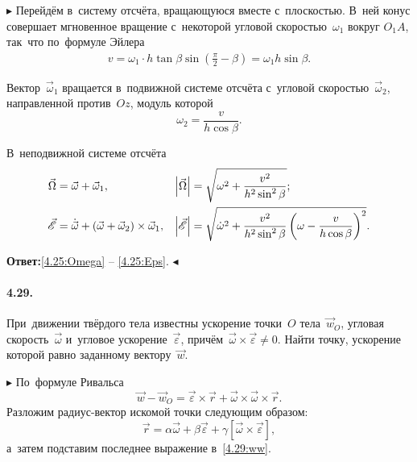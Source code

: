 \documentclass{weekly}
\begin{document}
$\blacktriangleright$ Перейдём в~систему отсчёта, вращающуюся
вместе с~плоскостью. В~ней конус совершает мгновенное вращение
с~некоторой угловой скоростью~$\omega_1$ вокруг $O_1A$,
так~что по~формуле Эйлера
\begin{align}
    v = \omega_1 \cdot h \tan\beta
            \sin\left(\frac{\pi}{2} - \beta\right)
        = \omega_1 h \sin\beta.
\end{align}

Вектор~$\vec\omega_1$ вращается в~подвижной системе отсчёта
с~угловой скоростью~$\vec\omega_2$, направленной
против~$Oz$, модуль которой
\begin{equation}
    \omega_2 = \frac{v}{h\cos\beta}.
\end{equation}

В~неподвижной системе отсчёта
\begin{align}
    \vec\Omega &= \vec\omega + \vec\omega_1, &
    \left| \vec\Omega \right| &= \sqrt{\omega^2 + \frac{v^2}{h^2\sin^2\beta}};
    \label{4.25:Omega}
\\
    \vec{\mathscr{E}} &= \dot{\vec\omega} +
            \left(\vec\omega + \vec\omega_2\right) \times \vec\omega_1, &
    \left| \vec{\mathscr{E}} \right| &= \sqrt{\dot\omega^2 +
            \frac{v^2}{h^2\sin^2\beta}
            \left(\omega - \frac{v}{h\cos\beta}\right)^2}.
    \label{4.25:Eps}
\end{align}

\textbf{Ответ:}\quad \eqref{4.25:Omega} -- \eqref{4.25:Eps}.
\hfill $\blacktriangleleft$


\paragraph{4.29.} При~движении твёрдого тела известны ускорение
точки~$O$ тела~$\vec w_O$, угловая скорость~$\vec\omega$
и~угловое ускорение~$\vec\varepsilon$,
причём~$\vec\omega \times \vec\varepsilon \neq 0$.
Найти точку, ускорение которой равно заданному вектору~$\vec w$.

$\blacktriangleright$ По~формуле Ривальса
\begin{equation}
    \vec w - \vec w_O = \vec\varepsilon \times \vec r +
            \vec\omega \times \vec\omega \times \vec r. \label{4.29:ww}
\end{equation}
Разложим радиус-вектор искомой точки следующим образом:
\begin{equation}
    \vec r = \alpha \vec\omega + \beta \vec\varepsilon +
            \gamma \left[\vec\omega \times \vec\varepsilon\right],
\end{equation}
а~затем подставим последнее выражение в~\eqref{4.29:ww}.
\end{document}
